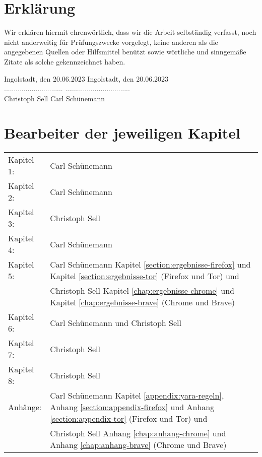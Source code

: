 \chapter*{Erklärung}

Wir erklären hiermit ehrenwörtlich, dass wir die Arbeit selbständig verfasst, noch nicht anderweitig für Prüfungszwecke vorgelegt, keine anderen als die angegebenen Quellen oder Hilfsmittel benützt sowie wörtliche und sinngemäße Zitate als solche gekennzeichnet haben.

\vspace{2cm}

Ingolstadt, den 20.06.2023 		\hfill Ingolstadt, den 20.06.2023			\\

\vspace{0.8cm}
.............................. 	\hfill .................................	\\
Christoph Sell 					\hfill Carl Schünemann						\\


\chapter*{Bearbeiter der jeweiligen Kapitel}


\begin{tabular}{ll}
	Kapitel 1:	& Carl Schünemann 																															\tabularnewline
	Kapitel 2:	& Carl Schünemann 																																		\tabularnewline
	Kapitel 3:	& Christoph Sell 																															\tabularnewline
	Kapitel 4:	& Carl Schünemann 																																\tabularnewline
	Kapitel 5:	& Carl Schünemann Kapitel \ref{section:ergebnisse-firefox} und Kapitel \ref{section:ergebnisse-tor}  (Firefox und Tor) und 										\tabularnewline
				& Christoph Sell  Kapitel \ref{chap:ergebnisse-chrome} und Kapitel \ref{chap:ergebnisse-brave} (Chrome und Brave) 												\tabularnewline
	Kapitel 6:	& Carl Schünemann und Christoph Sell																												\tabularnewline
	Kapitel 7:	& Christoph Sell 																																	\tabularnewline
	Kapitel 8:	& Christoph Sell 																																	\tabularnewline
	Anhänge:	& Carl Schünemann Kapitel \ref{appendix:yara-regeln}, Anhang \ref{section:appendix-firefox} und Anhang \ref{section:appendix-tor} (Firefox und Tor) und 		\tabularnewline
				& Christoph Sell Anhang \ref{chap:anhang-chrome} und Anhang \ref{chap:anhang-brave} (Chrome und Brave) 														\tabularnewline
	\end{tabular}


